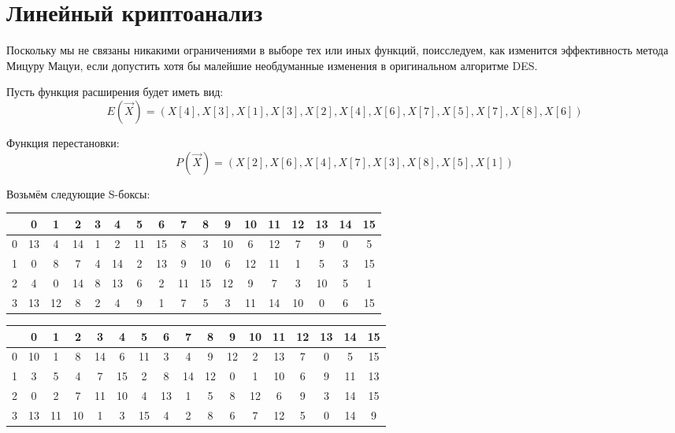 \section{Линейный криптоанализ}

Поскольку мы не связаны никакими ограничениями в выборе тех или иных функций, поисследуем, как изменится эффективность метода Мицуру Мацуи, если допустить хотя бы малейшие необдуманные изменения в оригинальном алгоритме DES.

Пусть функция расширения будет иметь вид: 
$$E(\vec{X}) = (X[4], X[3], X[1], X[3], X[2], X[4], X[6], X[7], X[5], X[7], X[8], X[6])$$

Функция перестановки:
$$P(\vec{X}) = (X[2], X[6], X[4], X[7], X[3], X[8], X[5], X[1])$$

Возьмём следующие S-боксы:

\medskip

\begin{tabular}{c||c|c|c|c|c|c|c|c|c|c|c|c|c|c|c|c}
& 0 & 1 & 2 & 3 & 4 & 5 & 6 & 7 & 8 & 9 & 10 & 11 & 12 & 13 & 14 & 15 \\
\hline
\hline
0 & 13 & 4 & 14 & 1 & 2 & 11 & 15 & 8 & 3 & 10 & 6 & 12 & 7 & 9 & 0 & 5 \\
\hline
1 & 0 & 8 & 7 & 4 & 14 & 2 & 13 & 9 & 10 & 6 & 12 & 11 & 1 & 5 & 3 & 15 \\
\hline
2 & 4 & 0 & 14 & 8 & 13 & 6 & 2 & 11 & 15 & 12 & 9 & 7 & 3 & 10 & 5 & 1 \\
\hline
3 & 13 & 12 & 8 & 2 & 4 & 9 & 1 & 7 & 5 & 3 & 11 & 14 & 10 & 0 & 6 & 15 \\
\end{tabular}

\medskip

\begin{tabular}{c||c|c|c|c|c|c|c|c|c|c|c|c|c|c|c|c}
    & 0 & 1 & 2 & 3 & 4 & 5 & 6 & 7 & 8 & 9 & 10 & 11 & 12 & 13 & 14 & 15 \\
    \hline
    \hline
    0 & 10 & 1 & 8 & 14 & 6 & 11 & 3 & 4 & 9 & 12 & 2 & 13 & 7 & 0 & 5 & 15 \\
    \hline
    1 & 3 & 5 & 4 & 7 & 15 & 2 & 8 & 14 & 12 & 0 & 1 & 10 & 6 & 9 & 11 & 13 \\
    \hline
    2 & 0 & 2 & 7 & 11 & 10 & 4 & 13 & 1 & 5 & 8 & 12 & 6 & 9 & 3 & 14 & 15 \\
    \hline
    3 & 13 & 11 & 10 & 1 & 3 & 15 & 4 & 2 & 8 & 6 & 7 & 12 & 5 & 0 & 14 & 9 \\
\end{tabular}

